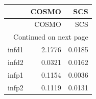 \begin{longtable}{lrr}
\toprule
{} &  COSMO &    SCS \\
\midrule
\endfirsthead

\toprule
{} &  COSMO &    SCS \\
\midrule
\endhead
\midrule
\multicolumn{3}{r}{{Continued on next page}} \\
\midrule
\endfoot

\bottomrule
\endlastfoot
infd1 & 2.1776 & 0.0185 \\
infd2 & 0.0321 & 0.0162 \\
infp1 & 0.1154 & 0.0036 \\
infp2 & 0.1119 & 0.0131 \\
\end{longtable}
